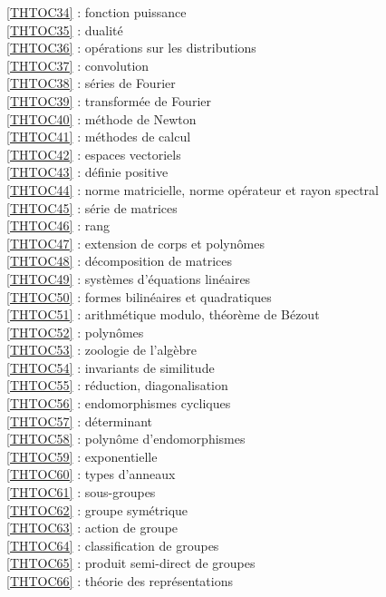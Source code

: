 \ref {THTOC34} : fonction puissance\\
\ref {THTOC35} : dualité\\
\ref {THTOC36} : opérations sur les distributions\\
\ref {THTOC37} : convolution\\
\ref {THTOC38} : séries de Fourier\\
\ref {THTOC39} : transformée de Fourier\\
\ref {THTOC40} : méthode de Newton\\
\ref {THTOC41} : méthodes de calcul\\
\ref {THTOC42} : espaces vectoriels\\
\ref {THTOC43} : définie positive\\
\ref {THTOC44} : norme matricielle, norme opérateur et rayon spectral\\
\ref {THTOC45} : série de matrices\\
\ref {THTOC46} : rang\\
\ref {THTOC47} : extension de corps et polynômes\\
\ref {THTOC48} : décomposition de matrices\\
\ref {THTOC49} : systèmes d'équations linéaires\\
\ref {THTOC50} : formes bilinéaires et quadratiques\\
\ref {THTOC51} : arithmétique modulo, théorème de Bézout\\
\ref {THTOC52} : polynômes\\
\ref {THTOC53} : zoologie de l'algèbre\\
\ref {THTOC54} : invariants de similitude\\
\ref {THTOC55} : réduction, diagonalisation\\
\ref {THTOC56} : endomorphismes cycliques\\
\ref {THTOC57} : déterminant\\
\ref {THTOC58} : polynôme d'endomorphismes\\
\ref {THTOC59} : exponentielle\\
\ref {THTOC60} : types d'anneaux\\
\ref {THTOC61} : sous-groupes\\
\ref {THTOC62} : groupe symétrique\\
\ref {THTOC63} : action de groupe\\
\ref {THTOC64} : classification de groupes\\
\ref {THTOC65} : produit semi-direct de groupes\\
\ref {THTOC66} : théorie des représentations\\
